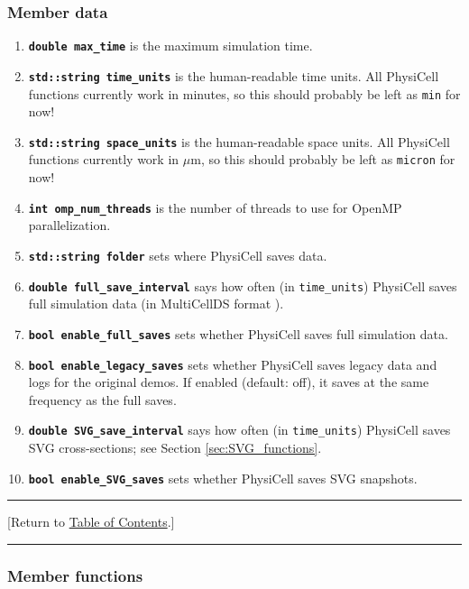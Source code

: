 \documentclass[12pt]{article}
\newcommand{\micron}{\mu\textrm{m}}
\renewcommand{\v}{\verb}
\newcommand{\smallcode}[1]{\textbf{\texttt{#1}}}
\newcommand{\TOClink}{\begin{center}\hrule\vskip-5pt\phantom{.}\hfill[Return to \hyperlink{TOC}{Table of Contents}.]\hfill\phantom{.}\vskip3pt\hrule\end{center}}
\begin{document}
\subsubsection{Member data}
\begin{enumerate}
\item 
\smallcode{double max\_time} is the maximum simulation time. 

\item 
\smallcode{std::string time\_units} is the human-readable time units. 
All PhysiCell functions currently work in minutes, so this should 
probably be left as \v|min| for now!

\item 
\smallcode{std::string space\_units} is the human-readable space units. 
All PhysiCell functions currently work in $\micron$, so this should 
probably be left as \v|micron| for now!

\item 
\smallcode{int omp\_num\_threads} is the number of threads to 
use for OpenMP parallelization. 

\item 
\smallcode{std::string folder} sets where PhysiCell saves data. 

\item 
\smallcode{double full\_save\_interval} says how often (in \v|time_units|) 
PhysiCell saves full simulation data (in MultiCellDS format \cite{ref:MultiCellDS}). 

\item 
\smallcode{bool enable\_full\_saves} sets whether PhysiCell saves 
full simulation data. 

\item 
\smallcode{bool enable\_legacy\_saves} sets whether PhysiCell saves 
legacy data and logs for the original demos. If enabled (default: off), 
it saves at the same frequency as the full saves. 

\item 
\smallcode{double SVG\_save\_interval} says how often (in \v|time_units|) 
PhysiCell saves SVG cross-sections; see Section \ref{sec:SVG_functions}. 

\item 
\smallcode{bool enable\_SVG\_saves} sets whether PhysiCell saves 
SVG snapshots.  
\end{enumerate}

\TOClink 

\subsubsection{Member functions}
\end{document}
